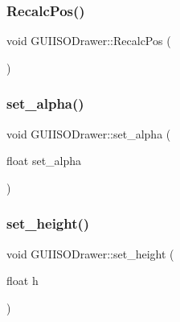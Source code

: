 \hypertarget{class_g_u_i_i_s_o_drawer_adf80342500dda36ae7812fd25efa06e6}{}\label{class_g_u_i_i_s_o_drawer_adf80342500dda36ae7812fd25efa06e6} 
\subsubsection{\texorpdfstring{Recalc\+Pos()}{RecalcPos()}}
{\footnotesize\ttfamily void G\+U\+I\+I\+S\+O\+Drawer\+::\+Recalc\+Pos (\begin{DoxyParamCaption}{ }\end{DoxyParamCaption})}

\hypertarget{class_g_u_i_i_s_o_drawer_a2e40c0403ab3df95afac304cf26209cf}{}\label{class_g_u_i_i_s_o_drawer_a2e40c0403ab3df95afac304cf26209cf} 
\subsubsection{\texorpdfstring{set\+\_\+alpha()}{set\_alpha()}}
{\footnotesize\ttfamily void G\+U\+I\+I\+S\+O\+Drawer\+::set\+\_\+alpha (\begin{DoxyParamCaption}\item[{float}]{set\+\_\+alpha }\end{DoxyParamCaption})}

\hypertarget{class_g_u_i_i_s_o_drawer_a66a7e7b467abe4f6f338f0303cbce421}{}\label{class_g_u_i_i_s_o_drawer_a66a7e7b467abe4f6f338f0303cbce421} 
\subsubsection{\texorpdfstring{set\+\_\+height()}{set\_height()}}
{\footnotesize\ttfamily void G\+U\+I\+I\+S\+O\+Drawer\+::set\+\_\+height (\begin{DoxyParamCaption}\item[{float}]{h }\end{DoxyParamCaption})}

\hypertarget{class_g_u_i_i_s_o_drawer_abc9f3d00ad852778bb521729342dc3f1}{}\label{class_g_u_i_i_s_o_drawer_abc9f3d00ad852778bb521729342dc3f1} 
